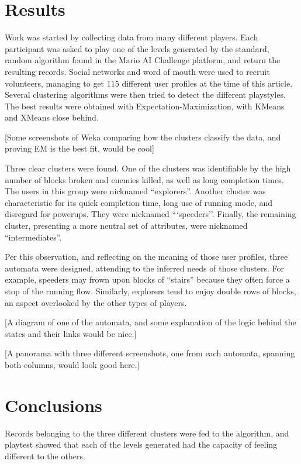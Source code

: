 \documentclass[conference]{IEEEtran}
\begin{document}
\section{Results}

Work was started by collecting data from many different players. Each participant was asked to play one of the levels generated by the standard, random algorithm found in the Mario AI Challenge platform, and return the resulting records. Social networks and word of mouth were used to recruit volunteers, managing to get 115 different user profiles at the time of this article. Several clustering algorithms were then tried to detect the different playstyles. The best results were obtained with Expectation-Maximization, with KMeans and XMeans close behind. 

[Some screenshots of Weka comparing how the clusters classify the data, and proving EM is the best fit, would be cool]

Three clear clusters were found. One of the clusters was identifiable by the high number of blocks broken and enemies killed, as well as long completion times. The users in this group were nicknamed ``explorers''. Another cluster was characteristic for its quick completion time, long use of running mode, and disregard for powerups. They were nicknamed ```speeders''. Finally, the remaining cluster, presenting a more neutral set of attributes, were nicknamed ``intermediates''.

Per this observation, and reflecting on the meaning of those user profiles, three automata were designed, attending to the inferred needs of those clusters. For example, speeders may frown upon blocks of ``stairs'' because they often force a stop of the running flow. Similarly, explorers tend to enjoy double rows of blocks, an aspect overlooked by the other types of players. 

[A diagram of one of the automata, and some explanation of the logic behind the states and their links would be nice.]

[A panorama with three different screenshots, one from each automata, spanning both columns, would look good here.]

\section{Conclusions}

Records belonging to the three different clusters were fed to the algorithm, and playtest showed that each of the levels generated had the capacity of feeling different to the others.
\end{document}

